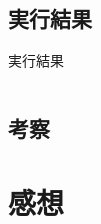 \documentclass[a4j,titlepage]{jarticle}
\begin{document}
\subsection{実行結果}
\begin{itembox}[l]{実行結果}
\begin{verbatim}

\end{verbatim}
\end{itembox}

\subsection{考察}


\section{感想}
\end{document}
